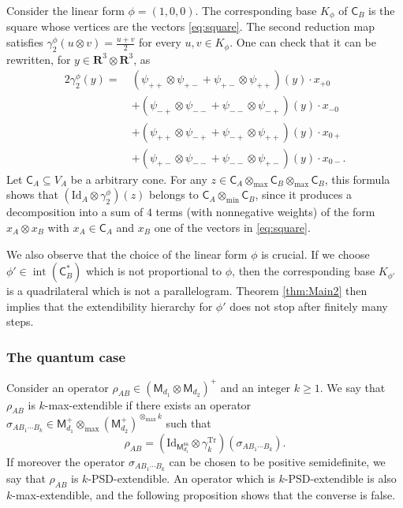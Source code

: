 \documentclass{amsart}
\renewcommand{\geq}{\geqslant}
\renewcommand{\subset}{\subseteq}
\newcommand{\gC}{\mathsf{C}}
\newcommand{\R}{\mathbf{R}}
\newcommand{\M}{\mathsf{M}}
\newcommand{\Id}{\mathrm{Id}}
\def\lb{\left(}
\def\rb{\right)}
\DeclareMathOperator{\inter}{int}
\DeclareMathOperator{\Tr}{Tr}
\theoremstyle{plain}
\newcommand{\tmin}{{\otimes_{\min}}}
\newcommand{\tmax}{{\otimes_{\max}}}
\begin{document}
Consider the linear form $\phi=(1,0,0)$. The corresponding base $K_\phi$ of $\gC_B$ is the square whose vertices are the vectors \eqref{eq:square}.
The second reduction map satisfies  $\gamma^\phi_2(u \otimes v) = \frac{u+v}{2}$ for every $u,v \in K_\phi$. One can check that it can be rewritten, for $y \in \R^3 \otimes \R^3$, as
\begin{equation*} 
\begin{split}
2\gamma^\phi_2(y) = \ 
  &  (\psi_{++}\otimes\psi_{+-} + \psi_{+-}\otimes\psi_{++})(y) \cdot x_{+0} \\
  & +  (\psi_{-+}\otimes\psi_{--} + \psi_{--}\otimes\psi_{-+})(y) \cdot x_{-0}\\
  & +  (\psi_{++}\otimes\psi_{-+} + \psi_{-+}\otimes\psi_{++})(y) \cdot x_{0+}\\
  & +  (\psi_{+-}\otimes\psi_{--} + \psi_{--}\otimes\psi_{+-})(y) \cdot x_{0-}.
\end{split}
\end{equation*}
Let $\gC_A \subset V_A$ be a arbitrary cone. For any $z \in \gC_A \tmax \gC_B \tmax \gC_B$, this formula shows that $(\Id_A \otimes \gamma_2^\phi)(z)$ belongs to $\gC_A \tmin \gC_B$, since it produces a decomposition into a sum of $4$ terms (with nonnegative weights) of the form $x_A \otimes x_B$ with $x_A \in \gC_A$ and $x_B$ one of the vectors in \eqref{eq:square}.

We also observe that the choice of the linear form $\phi$ is crucial. If we choose $\phi' \in \inter(\gC_B^*)$ which is not proportional to $\phi$, then the corresponding base $K_{\phi'}$ is a quadrilateral which is not a parallelogram. Theorem \ref{thm:Main2} then implies that the extendibility hierarchy for $\phi'$ does not stop after finitely many steps.

\subsubsection*{The quantum case}
Consider an operator $\rho_{AB} \in (\M_{d_1} \otimes \M_{d_2})^+$ and an integer $k \geq 1$. We say that $\rho_{AB}$ is $k$-max-extendible if there exists an operator $\sigma_{AB_1\cdots B_k} \in \M_{d_1}^+ \tmax \left(\M_{d_2}^+\right)^{\tmax k}$ such that \[
\rho_{AB} = \lb\Id_{\displaystyle \M^{\mathrm{sa}}_{d_1}}\otimes \gamma^{\Tr}_k\rb\lb \sigma_{AB_1\cdots B_k}\rb .
\]
If moreover the operator $\sigma_{AB_1\cdots B_k}$ can be chosen to be positive semidefinite, we say that $\rho_{AB}$ is $k$-PSD-extendible. An operator which is $k$-PSD-extendible is also $k$-max-extendible, and the following proposition shows that the converse is false.
\end{document}
